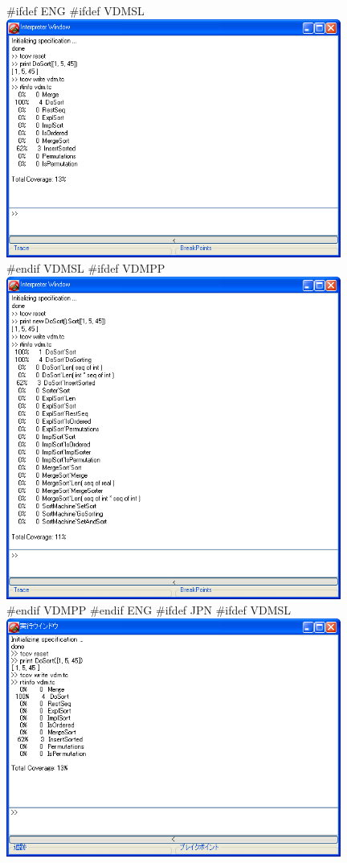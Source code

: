 \documentclass[\pformat,12pt]{article}
\begin{document}
\begin{figure}[tbh]
\begin{center}
#ifdef ENG
#ifdef VDMSL
\includegraphics[width=11cm]{guitcov-slENG.png}
#endif VDMSL
#ifdef VDMPP
\includegraphics[width=11cm]{guitcov-ppENG.png}
#endif VDMPP
#endif ENG
#ifdef JPN
#ifdef VDMSL
\includegraphics[width=11cm]{guitcov-sl.png}

\end{center}
\end{figure}
\end{document}

